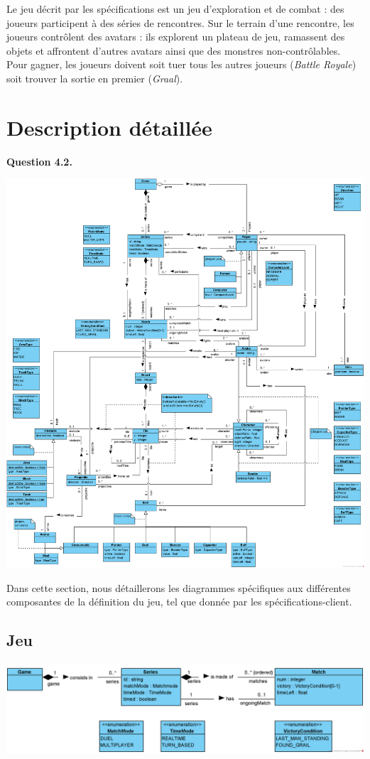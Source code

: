 \documentclass[oneside,a4paper]{book}
\begin{document}
Le jeu décrit par les spécifications est un jeu d'exploration et de combat : des joueurs participent à des séries de rencontres. Sur le terrain d'une rencontre, les joueurs contrôlent des avatars : ils explorent un plateau de jeu, ramassent des objets et affrontent d'autres avatars ainsi que des monstres non-contrôlables. Pour gagner, les joueurs doivent soit tuer tous les autres joueurs (\textit{Battle Royale}) soit trouver la sortie en premier (\textit{Graal}).

\newpage
\section{Description détaillée}
\textbf{Question 4.2.}\label{Question 4.2.}

\includegraphics[width=\textwidth,height=\textheight,keepaspectratio]{Diagrams/DJ-fullversion.png}\newline

Dans cette section, nous détaillerons les diagrammes spécifiques aux différentes composantes de la définition du jeu, tel que donnée par les spécifications-client.

\subsection{Jeu}
\includegraphics[width=\textwidth,height=\textheight,keepaspectratio]{Diagrams/DJ-Game.png}\newline
\end{document}
